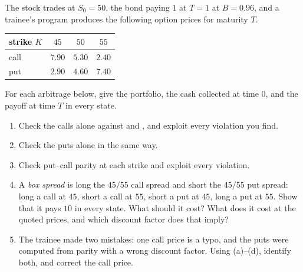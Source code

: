 \begin{exercise}\label{ex:arb-quotes}
\medium The stock trades at $S_0=50$, the bond paying $1$ at $T=1$ at $B=0.96$, and a
trainee's program produces the following option prices for maturity $T$.
\begin{center}
\begin{tabular}{lccc}
  \toprule
  strike $K$ & $45$ & $50$ & $55$\\
  \midrule
  call & $7.90$ & $5.30$ & $2.40$\\
  put & $2.90$ & $4.60$ & $7.40$\\
  \bottomrule
\end{tabular}
\end{center}
For each arbitrage below, give the portfolio, the cash collected at time $0$, and the payoff
at time $T$ in every state.
\begin{enumerate}[label=(\alph*)]
  \item Check the calls alone against  and ,
    and exploit every violation you find.
  \item Check the puts alone in the same way.
  \item Check put--call parity at each strike and exploit every violation.
  \item A \emph{box spread} is long the $45/55$ call spread and short the $45/55$ put spread:
    long a call at $45$, short a call at $55$, short a put at $45$, long a put at $55$. Show
    that it pays $10$ in every state. What should it cost? What does it cost at the quoted
    prices, and which discount factor does that imply?
  \item The trainee made two mistakes: one call price is a typo, and the puts were computed
    from parity with a wrong discount factor. Using (a)--(d), identify both, and correct the
    call price.
\end{enumerate}
\end{exercise}

